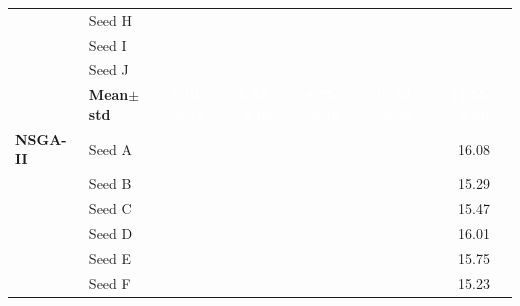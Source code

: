 \begin{table}[H]
{\begin{tabular}{@{}llccccc@{}}
  & Seed H & \cellcolor{RoyalBlue!10}{\small 5.17} & \cellcolor{RoyalBlue!10}{\small 6.71} & \cellcolor{RoyalBlue!10}{\small 8.60} & \cellcolor{RoyalBlue!10}{\small 10.70} & \cellcolor{RoyalBlue!10}{\small 12.23} \\
  & Seed I & \cellcolor{RoyalBlue!10}{\small 5.07} & \cellcolor{RoyalBlue!10}{\small 6.82} & \cellcolor{RoyalBlue!10}{\small 8.93} & \cellcolor{RoyalBlue!10}{\small 10.65} & \cellcolor{RoyalBlue!10}{\small 12.26} \\
  & Seed J & \cellcolor{RoyalBlue!10}{\small 5.19} & \cellcolor{RoyalBlue!10}{\small 6.80} & \cellcolor{RoyalBlue!10}{\small 8.88} & \cellcolor{RoyalBlue!10}{\small 11.28} & \cellcolor{RoyalBlue!10}{\small 12.68} \\
 & \textbf{Mean$\pm$std} & \cellcolor{RoyalBlue!65}\textcolor{white}{\textbf{5.10$\pm$0.15}} & \cellcolor{RoyalBlue!65}\textcolor{white}{\textbf{6.84$\pm$0.09}} & \cellcolor{RoyalBlue!65}\textcolor{white}{\textbf{8.75$\pm$0.19}} & \cellcolor{RoyalBlue!65}\textcolor{white}{\textbf{10.82$\pm$0.23}} & \cellcolor{RoyalBlue!65}\textcolor{white}{\textbf{12.55$\pm$0.30}} \\
\midrule
 \textbf{NSGA-II} & Seed A & \cellcolor{RoyalBlue!10}{\small 8.71} & \cellcolor{RoyalBlue!10}{\small 9.81} & \cellcolor{RoyalBlue!10}{\small 12.52} & \cellcolor{RoyalBlue!10}{\small 13.60} & {\small\color{gray!60!black}16.08} \\
  & Seed B & \cellcolor{RoyalBlue!10}{\small 9.13} & \cellcolor{RoyalBlue!10}{\small 11.70} & \cellcolor{RoyalBlue!10}{\small 12.66} & \cellcolor{RoyalBlue!10}{\small 14.10} & {\small\color{gray!60!black}15.29} \\
  & Seed C & \cellcolor{RoyalBlue!10}{\small 9.06} & \cellcolor{RoyalBlue!10}{\small 10.33} & \cellcolor{RoyalBlue!10}{\small 12.63} & \cellcolor{RoyalBlue!10}{\small 14.45} & {\small\color{gray!60!black}15.47} \\
  & Seed D & \cellcolor{RoyalBlue!10}{\small 8.24} & \cellcolor{RoyalBlue!10}{\small 11.61} & \cellcolor{RoyalBlue!10}{\small 12.36} & \cellcolor{RoyalBlue!10}{\small 13.84} & {\small\color{gray!60!black}16.01} \\
  & Seed E & \cellcolor{RoyalBlue!10}{\small 8.86} & \cellcolor{RoyalBlue!10}{\small 11.40} & \cellcolor{RoyalBlue!10}{\small 12.92} & \cellcolor{RoyalBlue!10}{\small 13.58} & {\small\color{gray!60!black}15.75} \\
  & Seed F & \cellcolor{RoyalBlue!10}{\small 8.78} & \cellcolor{RoyalBlue!10}{\small 10.66} & \cellcolor{RoyalBlue!10}{\small 12.50} & \cellcolor{RoyalBlue!10}{\small 14.48} & {\small\color{gray!60!black}15.23} \\

\end{tabular}}
\end{table}
